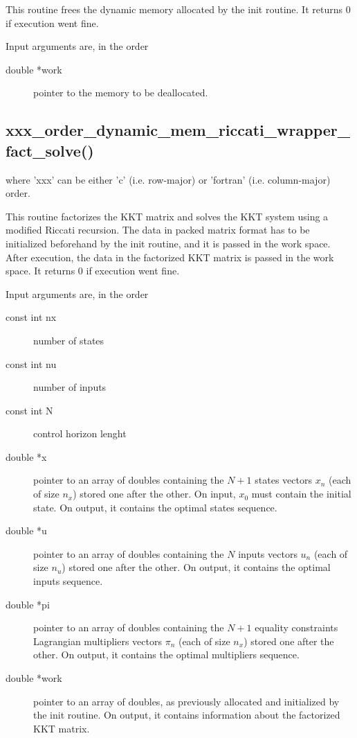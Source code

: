 \documentclass[a4paper]{report}
\begin{document}
This routine frees the dynamic memory allocated by the init routine.
It returns 0 if execution went fine.

Input arguments are, in the order
\begin{description}
\item[double *work] pointer to the memory to be deallocated.
\end{description}


\subsection{xxx\_order\_dynamic\_mem\_riccati\_wrapper\_fact\_solve() } 
where 'xxx' can be either 'c' (i.e. row-major) or 'fortran' (i.e. column-major) order.

This routine factorizes the KKT matrix and solves the KKT system using a modified Riccati recursion.
The data in packed matrix format has to be initialized beforehand by the init routine, and it is passed in the work space.
After execution, the data in the factorized KKT matrix is passed in the work space.
It returns 0 if execution went fine.

Input arguments are, in the order
\begin{description}
\item[const int nx] number of states
\item[const int nu] number of inputs
\item[const int N] control horizon lenght
\item[double *x] pointer to an array of doubles containing the $N+1$ states vectors $x_n$ (each of size $n_x$) stored one after the other. On input, $x_0$ must contain the initial state. On output, it contains the optimal states sequence.
\item[double *u] pointer to an array of doubles containing the $N$ inputs vectors $u_n$ (each of size $n_u$) stored one after the other. On output, it contains the optimal inputs sequence.
\item[double *pi] pointer to an array of doubles containing the $N+1$ equality constraints Lagrangian multipliers vectors $\pi_n$ (each of size $n_x$) stored one after the other. On output, it contains the optimal multipliers sequence.
\item[double *work] pointer to an array of doubles, as previously allocated and initialized by the init routine. On output, it contains information about the factorized KKT matrix.
\end{description}
\end{document}
